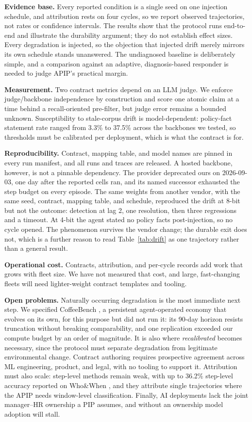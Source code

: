 \documentclass[conference]{IEEEtran}
\begin{document}
\textbf{Evidence base.} Every reported condition is a single seed on one injection schedule, and attribution rests on four cycles, so we report observed trajectories, not rates or confidence intervals. The results show that the protocol runs end-to-end and illustrate the durability argument; they do not establish effect sizes. Every degradation is injected, so the objection that injected drift merely mirrors its own schedule stands unanswered. The undiagnosed baseline is deliberately simple, and a comparison against an adaptive, diagnosis-based responder is needed to judge APIP's practical margin.

\textbf{Measurement.} Two contract metrics depend on an LLM judge. We enforce judge/backbone independence by construction and score one atomic claim at a time behind a recall-oriented pre-filter, but judge error remains a bounded unknown. Susceptibility to stale-corpus drift is model-dependent: policy-fact statement rate ranged from 3.3\% to 37.5\% across the backbones we tested, so thresholds must be calibrated per deployment, which is what the contract is for.

\textbf{Reproducibility.} Contract, mapping table, and model names are pinned in every run manifest, and all runs and traces are released. A hosted backbone, however, is not a pinnable dependency. The provider deprecated ours on 2026-09-03, one day after the reported cells ran, and its named successor exhausted the step budget on every episode. The same weights from another vendor, with the same seed, contract, mapping table, and schedule, reproduced the drift at 8-bit but not the outcome: detection at lag 2, one resolution, then three regressions and a timeout. At 4-bit the agent stated no policy facts post-injection, so no cycle opened. The phenomenon survives the vendor change; the durable exit does not, which is a further reason to read Table~\ref{tab:drift} as one trajectory rather than a general result.

\textbf{Operational cost.} Contracts, attribution, and per-cycle records add work that grows with fleet size. We have not measured that cost, and large, fast-changing fleets will need lighter-weight contract templates and tooling.

\textbf{Open problems.} Naturally occurring degradation is the most immediate next step. We specified CoffeeBench \cite{ref20}, a persistent agent-operated economy that evolves on its own, for this purpose but did not run it: its 90-day horizon resists truncation without breaking comparability, and one replication exceeded our compute budget by an order of magnitude. It is also where \emph{recalibrated} becomes necessary, since the protocol must separate degradation from legitimate environmental change. Contract authoring requires prospective agreement across ML engineering, product, and legal, with no tooling to support it. Attribution must also scale: step-level methods remain weak, with up to 36.2\% step-level accuracy reported on Who\&When \cite{ref15}, and they attribute single trajectories where the APIP needs window-level classification. Finally, AI deployments lack the joint manager--HR ownership a PIP assumes, and without an ownership model adoption will stall.
\end{document}
